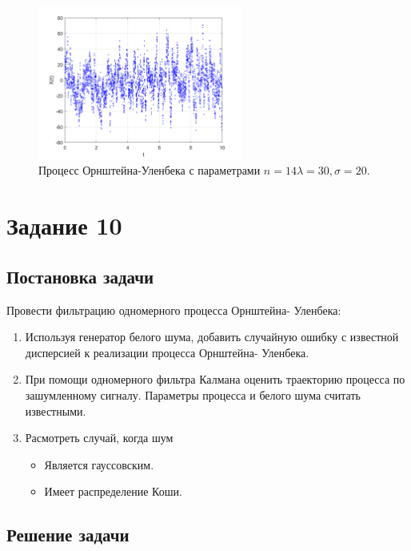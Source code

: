 \documentclass[oneside, final, 12pt]{article}
\begin{document}
     \begin{figure}[h!]
		\centering
		\includegraphics[width=0.6\textwidth]{../code/Task_9/pict/ou_12_30_20_ex.png}
		\caption{Процесс Орнштейна-Уленбека с параметрами  $n = 14 \lambda = 30, \sigma = 20$.}
    \end{figure}
\newpage
\section{Задание 10}

\subsection{Постановка задачи}
	Провести фильтрацию одномерного процесса Орнштейна- Уленбека:
    \begin{enumerate} 
        \item Используя генератор белого шума, добавить случайную ошибку с известной дисперсией к реализации 
        		процесса Орнштейна- Уленбека. 
        \item При помощи одномерного фильтра Калмана оценить траекторию процесса по зашумленному сигналу.
        		Параметры процесса и белого шума считать известными. 
        \item Расмотреть случай, когда шум
        	\begin{itemize}
        		\item Является гауссовским. 
        		\item Имеет распределение Коши.
        	\end{itemize}
    \end{enumerate}
\subsection{Решение задачи}
\end{document}
